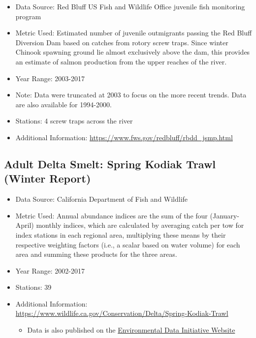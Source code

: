 \documentclass[
]{book}
\providecommand{\tightlist}{%
  \setlength{\itemsep}{0pt}\setlength{\parskip}{0pt}}
\begin{document}
\begin{itemize}
\tightlist
\item
  Data Source: Red Bluff US Fish and Wildlife Office juvenile fish monitoring program
\item
  Metric Used: Estimated number of juvenile outmigrants passing the Red Bluff Diversion Dam based on catches from rotory screw traps. Since winter Chinook spawning ground lie almost exclusively above the dam, this provides an estimate of salmon production from the upper reaches of the river.
\item
  Year Range: 2003-2017
\item
  Note: Data were truncated at 2003 to focus on the more recent trends. Data are also available for 1994-2000.
\item
  Stations: 4 screw traps across the river
\item
  Additional Information: \url{https://www.fws.gov/redbluff/rbdd_jsmp.html}
\end{itemize}

\hypertarget{adult-delta-smelt-spring-kodiak-trawl-winter-report}{%
\subsection{Adult Delta Smelt: Spring Kodiak Trawl (Winter Report)}\label{adult-delta-smelt-spring-kodiak-trawl-winter-report}}

\begin{itemize}
\tightlist
\item
  Data Source: California Department of Fish and Wildlife
\item
  Metric Used: Annual abundance indices are the sum of the four (January-April) monthly indices, which are calculated by averaging catch per tow for index stations in each regional area, multiplying these means by their respective weighting factors (i.e., a scalar based on water volume) for each area and summing these products for the three areas.
\item
  Year Range: 2002-2017
\item
  Stations: 39
\item
  Additional Information: \url{https://www.wildlife.ca.gov/Conservation/Delta/Spring-Kodiak-Trawl}

  \begin{itemize}
  \tightlist
  \item
    Data is also published on the \href{https://doi.org/10.6073/pasta/aeea28f969ed79086b845e1f6ab89d18}{Environmental Data Initiative Website}
  \end{itemize}
\end{itemize}
\end{document}
